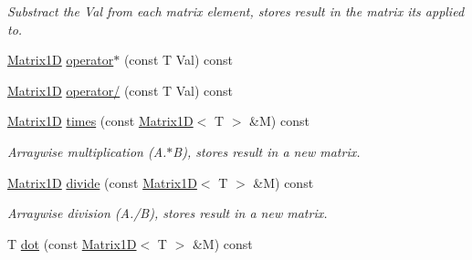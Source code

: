 \begin{DoxyCompactItemize}
\begin{DoxyCompactList}\small\item\em Substract the Val from each matrix element, stores result in the matrix it\textquotesingle{}s applied to. \end{DoxyCompactList}\item 
\hyperlink{class_matrix1_d}{Matrix1\+D} \hyperlink{class_matrix1_d_a0f17701bbb64620a8ab571325cc6b690}{operator$\ast$} (const T Val) const 
\item 
\hyperlink{class_matrix1_d}{Matrix1\+D} \hyperlink{class_matrix1_d_a37b0423ec38354bed65ff1c972261c60}{operator/} (const T Val) const 
\item 
\hyperlink{class_matrix1_d}{Matrix1\+D} \hyperlink{class_matrix1_d_a9d3021574a07b36aac54ce52c88847bf}{times} (const \hyperlink{class_matrix1_d}{Matrix1\+D}$<$ T $>$ \&M) const 
\begin{DoxyCompactList}\small\item\em Arraywise multiplication (A.$\ast$\+B), stores result in a new matrix. \end{DoxyCompactList}\item 
\hyperlink{class_matrix1_d}{Matrix1\+D} \hyperlink{class_matrix1_d_ad2752962cd5127fded7812499912cddc}{divide} (const \hyperlink{class_matrix1_d}{Matrix1\+D}$<$ T $>$ \&M) const 
\begin{DoxyCompactList}\small\item\em Arraywise division (A./\+B), stores result in a new matrix. \end{DoxyCompactList}\item 
\hypertarget{class_matrix1_d_ab6d5bc4a45185c0c0f2c7470b5885061}{}T \hyperlink{class_matrix1_d_ab6d5bc4a45185c0c0f2c7470b5885061}{dot} (const \hyperlink{class_matrix1_d}{Matrix1\+D}$<$ T $>$ \&M) const \label{class_matrix1_d_ab6d5bc4a45185c0c0f2c7470b5885061}


\end{DoxyCompactItemize}
